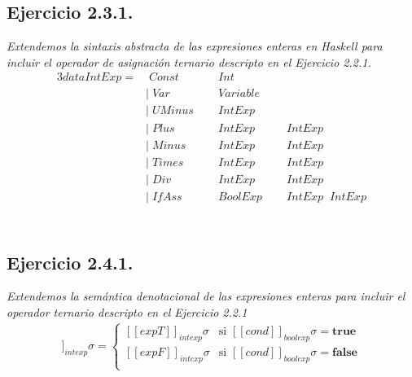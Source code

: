 \documentclass[a4paper,10pt]{article}
\begin{document}
\subsection*{Ejercicio 2.3.1.}
	\emph{Extendemos la sintaxis abstracta de las expresiones enteras en Haskell para incluir el operador de asignación ternario descripto en el Ejercicio 2.2.1.}
	\\
	\begin{alignat*}{3}
	data IntExp=&\;Const\;     &&Int\\
	    		&|\;Var\;      &&Variable\\
				&|\;UMinus\;\; &&IntExp\\
				&|\;Plus\;     &&IntExp\;     &&IntExp\\
				&|\;Minus\;    &&IntExp\;     &&IntExp\\
				&|\;Times\;    &&IntExp\;     &&IntExp\\
				&|\;Div\;      &&IntExp\;     &&IntExp\\
				&|\;IfAss\;    &&BoolExp\;\;  &&IntExp\;\; IntExp\\
	\end{alignat*}
\\
\subsection*{Ejercicio 2.4.1.}
	\emph{Extendemos la semántica denotacional de las expresiones enteras para incluir el operador ternario descripto en el Ejercicio 2.2.1}
	\\
	\begin{align*}
		[\![ cond\;?\; expT\;:\;expF ]\!]_{intexp}\sigma = 
		\begin{cases} 
			[\![expT]\!]_{intexp}\sigma &\mbox{si } [\![cond]\!]_{boolexp}\sigma = \textbf{true} \\
			[\![expF]\!]_{intexp}\sigma &\mbox{si } [\![cond]\!]_{boolexp}\sigma = \textbf{false} \\
		\end{cases}
	\end{align*}
\pagebreak
\end{document}
